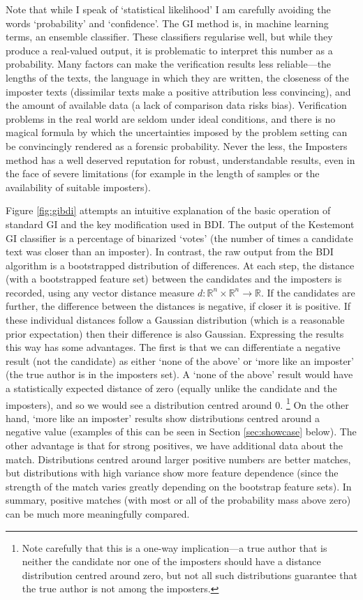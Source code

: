 \documentclass[
    hf
]{ceurart}
\begin{document}
Note that while I speak of `statistical likelihood' I am carefully avoiding the words `probability'
and `confidence'. The GI method is, in machine learning terms, an ensemble classifier. These
classifiers regularise well, but while they produce a real-valued output, it is problematic to
interpret this number as a probability. Many factors can make the verification results less
reliable---the lengths of the texts, the language in which they are written, the closeness of the
imposter texts (dissimilar texts make a positive attribution less convincing), and the amount of
available data (a lack of comparison data risks bias). Verification problems in the real world are
seldom under ideal conditions, and there is no magical formula by which the uncertainties imposed by
the problem setting can be convincingly rendered as a forensic probability. Never the less, the
Imposters method has a well deserved reputation for robust, understandable results, even in the face
of severe limitations (for example in the length of samples or the availability of suitable
imposters).

Figure \ref{fig:gibdi} attempts an intuitive explanation of the basic operation of standard GI and
the key modification used in BDI. The output of the Kestemont GI classifier is a percentage of
binarized `votes' (the number of times a candidate text was closer than an imposter). In contrast,
the raw output from the BDI algorithm is a bootstrapped distribution of differences. At each step,
the distance (with a bootstrapped feature set) between the candidates and the imposters is recorded,
using any vector distance measure $d: \mathbb{R}^n \times \mathbb{R}^n \rightarrow \mathbb{R}$. If
the candidates are further, the difference between the distances is negative, if closer it is
positive. If these individual distances follow a Gaussian distribution (which is a reasonable prior
expectation) then their difference is also Gaussian. Expressing the results this way has some
advantages. The first is that we can differentiate a negative result (not the candidate) as either
`none of the above' or `more like an imposter' (the true author is in the imposters set). A `none of
the above' result would have a statistically expected distance of zero (equally unlike the candidate
and the imposters), and so we would see a distribution centred around 0.%
%
\footnote{ Note carefully that this is a one-way implication---a true author
    that is neither the candidate nor one of the imposters should have a
    distance distribution centred around zero, but not all such distributions
    guarantee that the true author is not among the imposters.}
%
On the other hand, `more like an imposter' results show distributions centred around a negative
value (examples of this can be seen in Section \ref{sec:showcase} below). The other advantage is
that for strong positives, we have additional data about the match. Distributions centred around
larger positive numbers are better matches, but distributions with high variance show more feature
dependence (since the strength of the match varies greatly depending on the bootstrap feature sets).
In summary, positive matches (with most or all of the probability mass above zero) can be much more
meaningfully compared.
\end{document}
